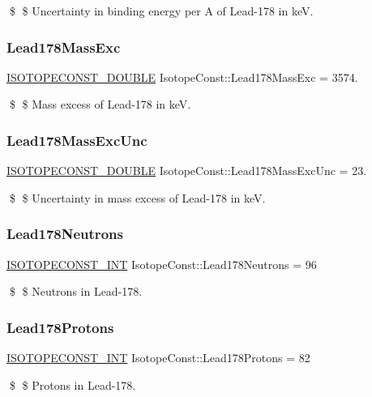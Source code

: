 \$ \$ Uncertainty in binding energy per A of Lead-\/178 in keV. \mbox{\label{group___isotope_const-_lead-_pb178_gae158b44d4fe34e535a03e9eeeb17c43a}} 
\subsubsection{\texorpdfstring{Lead178\+Mass\+Exc}{Lead178MassExc}}
{\footnotesize\ttfamily \mbox{\hyperlink{group___isotope_const-_macros_ga8f45a7272ce02c0b4c65c44636ed719a}{I\+S\+O\+T\+O\+P\+E\+C\+O\+N\+S\+T\+\_\+\+D\+O\+U\+B\+LE}} Isotope\+Const\+::\+Lead178\+Mass\+Exc = 3574.}

\$ \$ Mass excess of Lead-\/178 in keV. \mbox{\label{group___isotope_const-_lead-_pb178_ga8a899c2119fa4b39fa1612c14a54a9dd}} 
\subsubsection{\texorpdfstring{Lead178\+Mass\+Exc\+Unc}{Lead178MassExcUnc}}
{\footnotesize\ttfamily \mbox{\hyperlink{group___isotope_const-_macros_ga8f45a7272ce02c0b4c65c44636ed719a}{I\+S\+O\+T\+O\+P\+E\+C\+O\+N\+S\+T\+\_\+\+D\+O\+U\+B\+LE}} Isotope\+Const\+::\+Lead178\+Mass\+Exc\+Unc = 23.}

\$ \$ Uncertainty in mass excess of Lead-\/178 in keV. \mbox{\label{group___isotope_const-_lead-_pb178_ga61b0082a129d2f847bdd4b86cb64b6d3}} 
\subsubsection{\texorpdfstring{Lead178\+Neutrons}{Lead178Neutrons}}
{\footnotesize\ttfamily \mbox{\hyperlink{group___isotope_const-_macros_ga5f18360b3e99483a35c32d789e62621c}{I\+S\+O\+T\+O\+P\+E\+C\+O\+N\+S\+T\+\_\+\+I\+NT}} Isotope\+Const\+::\+Lead178\+Neutrons = 96}

\$ \$ Neutrons in Lead-\/178. \mbox{\label{group___isotope_const-_lead-_pb178_gab84aa832988a28f59dd8ff51b493452c}} 
\subsubsection{\texorpdfstring{Lead178\+Protons}{Lead178Protons}}
{\footnotesize\ttfamily \mbox{\hyperlink{group___isotope_const-_macros_ga5f18360b3e99483a35c32d789e62621c}{I\+S\+O\+T\+O\+P\+E\+C\+O\+N\+S\+T\+\_\+\+I\+NT}} Isotope\+Const\+::\+Lead178\+Protons = 82}

\$ \$ Protons in Lead-\/178. 